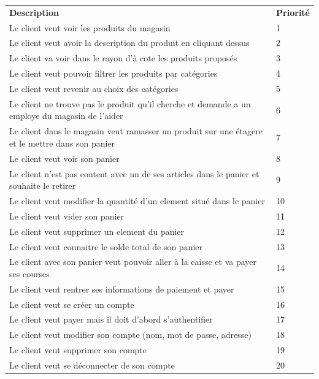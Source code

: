 \documentclass[12pt]{article}
\begin{document}
\begin{center}
    \begin{tabular}{ | L{13cm} || C{2cm} | }
        \hline
        \textbf{Description} & \textbf{Priorité}\\
        \hhline{|=||=|}
        Le client veut voir les produits du magasin & 1\\
        \hline
        Le client veut avoir la description du produit en cliquant dessus & 2\\
        \hline
        Le client va voir dans le rayon d'à cote les produits proposés & 3\\
        \hline
        Le client veut pouvoir filtrer les produits par catégories & 4\\
        \hline
        Le client veut revenir au choix des catégories & 5\\
        \hline
        Le client ne trouve pas le produit qu'il cherche et demande a un employe du magasin de l'aider & 6\\
        \hline
        Le client dans le magasin veut ramasser un produit sur une étagere et le mettre dans son panier & 7\\
        \hline
        Le client veut voir son panier & 8\\
        \hline
        Le client n'est pas content avec un de ses articles dans le panier et souhaite le retirer & 9\\
        \hline
        Le client veut modifier la quantité d'un element situé dans le panier & 10\\
        \hline
        Le client veut vider son panier & 11\\
        \hline
        Le client veut supprimer un element du panier & 12\\
        \hline
        Le client veut connaitre le solde total de son panier & 13\\
        \hline
        Le client avec son panier veut pouvoir aller à la caisse et va payer ses courses & 14\\
        \hline
        Le client veut rentrer ses informations de paiement et payer & 15\\
        \hline
        Le client veut se créer un compte & 16\\
        \hline
        Le client veut payer mais il doit d'abord s'authentifier & 17\\
        \hline
        Le client veut modifier son compte (nom, mot de passe, adresse) & 18\\
        \hline
        Le client veut supprimer son compte & 19\\
        \hline
        Le client veut se déconnecter de son compte & 20\\
        \hline
    \end{tabular}
\end{center}
\end{document}
